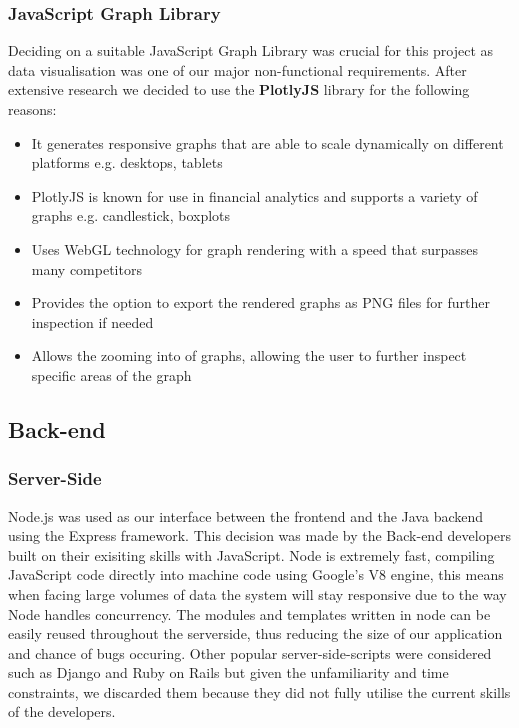 \documentclass[12pt]{article}
\begin{document}
  \subsubsection{JavaScript Graph Library}
  Deciding on a suitable JavaScript Graph Library was crucial for this project as data visualisation was one of our major non-functional requirements.
  After extensive research we decided to use the \textbf{PlotlyJS} library for the following reasons:
  \begin{itemize}
    \item It generates responsive graphs that are able to scale dynamically on different platforms e.g. desktops, tablets
    \item PlotlyJS is known for use in financial analytics and supports a variety of graphs e.g. candlestick, boxplots
    \item Uses WebGL technology for graph rendering with a speed that surpasses many competitors
    \item Provides the option to export the rendered graphs as PNG files for further inspection if needed
    \item Allows the zooming into of graphs, allowing the user to further inspect specific areas of the graph
  \end{itemize}
  \subsection{Back-end}
    \subsubsection{Server-Side}
    Node.js was used as our interface between the frontend and the Java backend using the Express framework.
    This decision was made by the Back-end developers built on their exisiting skills with JavaScript. Node is extremely fast,
    compiling JavaScript code directly into machine code using Google's V8 engine, this means when facing large volumes of data
    the system will stay responsive due to the way Node handles concurrency. The modules and templates written in node can be easily
    reused throughout the serverside, thus reducing the size of our application and chance of bugs occuring.
    \newline
    Other popular server-side-scripts were considered such as Django and Ruby on Rails but given the unfamiliarity and time
    constraints, we discarded them because they did not fully utilise the current skills of the developers.
\end{document}
